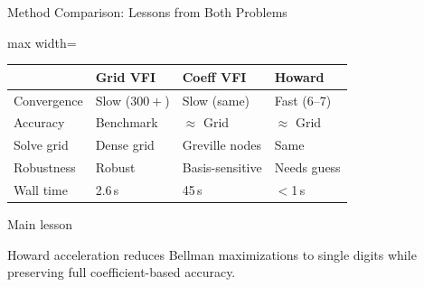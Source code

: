 \documentclass[aspectratio=169,11pt]{beamer}
\begin{document}
\begin{frame}[shrink=8]{Method Comparison: Lessons from Both Problems}
    \vspace{-0.3em}
    \begin{adjustbox}{max width=\textwidth}
    \scriptsize
    \setlength{\tabcolsep}{5pt}
    \begin{tabular}{lp{3cm}p{3cm}p{3cm}}
        \toprule
        & \textbf{Grid VFI} & \textbf{Coeff VFI} & \textbf{Howard} \\
        \midrule
        Convergence & Slow ($300+$) & Slow (same) & Fast (6--7) \\
        Accuracy & Benchmark & $\approx$ Grid & $\approx$ Grid \\
        Solve grid & Dense grid & Greville nodes & Same \\
        Robustness & Robust & Basis-sensitive & Needs guess \\
        Wall time & 2.6\,s & 45\,s & $<$1\,s \\
        \bottomrule
    \end{tabular}
    \end{adjustbox}

    \vspace{0.2em}
    \begin{alertblock}{Main lesson}
        {\sloppy Howard acceleration reduces Bellman maximizations to single digits while preserving full coefficient-based accuracy.\par}
    \end{alertblock}
\end{frame}
\end{document}
